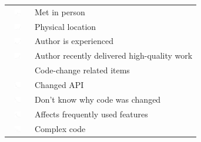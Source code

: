 \begin{table}[t!]
\begin{tabular}{ll}
\vspace{-2pt}\includegraphics[height=10px, width=30px]{figures/sparkles/met-change-author-in-person.pdf} & Met in person\\
\vspace{-2pt}\includegraphics[height=10px, width=30px]{figures/sparkles/physical-location-of-the-change-author.pdf} & Physical location\\
\vspace{-2pt}\includegraphics[height=10px, width=30px]{figures/sparkles/change-author-is-experienced.pdf} & Author is experienced\\
\vspace{-2pt}\includegraphics[height=10px, width=30px]{figures/sparkles/recent-work-of-high-quality.pdf} & Author recently delivered high-quality work\\
\midrule
\vspace{-2pt}& Code-change related items \\
\midrule
\vspace{-2pt}\includegraphics[height=10px, width=30px]{figures/sparkles/change-modified-API.pdf} & Changed API\\
\vspace{-2pt}\includegraphics[height=10px, width=30px]{figures/sparkles/don-t-know-why-code-was-changed.pdf} & Don't know why code was changed\\
\vspace{-2pt}\includegraphics[height=10px, width=30px]{figures/sparkles/code-affects-frequently-used-features.pdf} & Affects frequently used features\\
\vspace{-2pt}\includegraphics[height=10px, width=30px]{figures/sparkles/complex-code-was-changed.pdf} & Complex code\\

\end{tabular}
\end{table}
